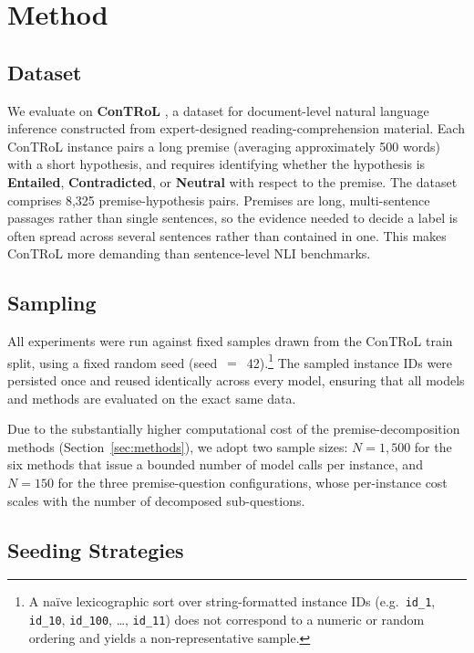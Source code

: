 \section{Method}
\label{sec:method}

\subsection{Dataset}
\label{sec:dataset}

We evaluate on \textbf{ConTRoL} \citep{liu-etal-2021-natural}, a dataset for
document-level natural language inference constructed from expert-designed
reading-comprehension material. Each ConTRoL instance pairs a long premise
(averaging approximately 500 words) with a short hypothesis, and requires
identifying whether the hypothesis is \textbf{Entailed}, \textbf{Contradicted},
or \textbf{Neutral} with respect to the premise. The dataset comprises 8,325
premise-hypothesis pairs. Premises are long, multi-sentence passages rather
than single sentences, so the evidence needed to decide a label is often
spread across several sentences rather than contained in one. This makes
ConTRoL more demanding than sentence-level NLI benchmarks.

\subsection{Sampling}
\label{sec:sampling}

All experiments were run against fixed samples drawn from the ConTRoL train
split, using a fixed random seed (seed~$=$~42).\footnote{A na\"ive
lexicographic sort over string-formatted instance IDs (e.g.\ \texttt{id\_1},
\texttt{id\_10}, \texttt{id\_100}, \ldots, \texttt{id\_11}) does not
correspond to a numeric or random ordering and yields a non-representative
sample.} The sampled instance IDs were persisted once and reused identically
across every model, ensuring that all models and methods are evaluated on the
exact same data.

Due to the substantially higher computational cost of the premise-decomposition
methods (Section~\ref{sec:methods}), we adopt two sample sizes: $N=1{,}500$
for the six methods that issue a bounded number of model calls per instance,
and $N=150$ for the three premise-question configurations, whose per-instance
cost scales with the number of decomposed sub-questions.

\subsection{Seeding Strategies}
\label{sec:seeding}

